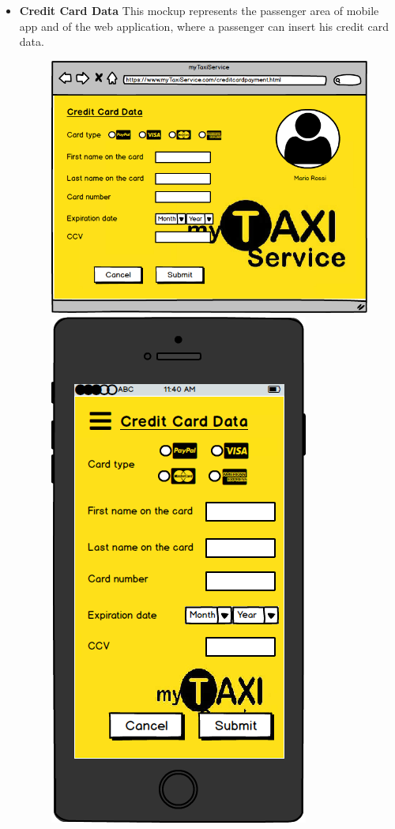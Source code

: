 \documentclass[18pt,oneside,a4paper, titlepage]{article}
\begin{document}
\begin{itemize}
\begin{figure}[h]
				\end{figure}
				\\ \\ \\ 
				\item \textbf{Credit Card Data} This mockup represents the passenger area of mobile app and of the web application, where a passenger can insert his credit card data.\\
				\begin{figure}[h]
					\includegraphics[scale=0.3]{Mockups/WebAppCreditCardData.png}%
					\qquad\qquad
					\includegraphics[scale=0.3]{Mockups/MobileAppCreditCardData.png}

\end{figure}
\end{itemize}
\end{document}
